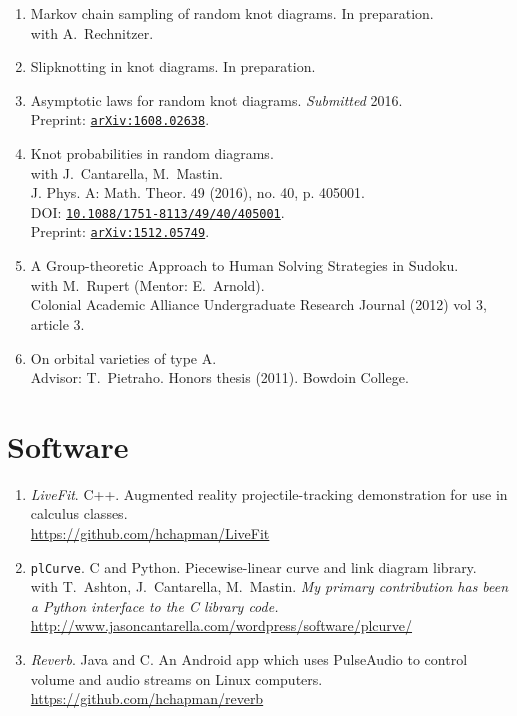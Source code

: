 \documentclass[letterpaper]{article}
\begin{document}
\begin{enumerate}
\item Markov chain sampling of random knot diagrams. In preparation. \\
  with A.\ Rechnitzer.
\item Slipknotting in knot diagrams. In preparation.
\item Asymptotic laws for random knot diagrams. \emph{Submitted} 2016. \\
  Preprint: \href{http://arxiv.org/abs/1608.02638}{\tt arXiv:1608.02638}.
\item Knot probabilities in random diagrams.\\
  with J.\ Cantarella, M.\ Mastin. \\
  J. Phys. A: Math. Theor. 49 (2016), no. 40, p. 405001.\\
  DOI: \href{http://dx.doi.org/10.1088/1751-8113/49/40/405001}{\tt 10.1088/1751-8113/49/40/405001}.\\
  Preprint: \href{http://arxiv.org/abs/1512.05749}{\tt arXiv:1512.05749}.
\item A Group-theoretic Approach to Human Solving Strategies in
  Sudoku.\\
  with M.\ Rupert (Mentor: E.\ Arnold). \\
  Colonial Academic Alliance Undergraduate Research Journal (2012) vol
  3, article 3.
\item On orbital varieties of type A. \\
  Advisor: T.\ Pietraho. Honors thesis (2011). Bowdoin
  College.
\end{enumerate}

\section*{Software}

\begin{enumerate}
\item \emph{LiveFit}. C++. Augmented reality projectile-tracking demonstration
  for use in calculus classes. \\
  \url{https://github.com/hchapman/LiveFit}
\item \texttt{plCurve}. C and Python. Piecewise-linear curve and link diagram library.\\
  with T.\ Ashton, J.\ Cantarella, M.\ Mastin.
  \textit{My primary contribution has been a Python interface to the C
    library code.} \\
  \url{http://www.jasoncantarella.com/wordpress/software/plcurve/}
\item \emph{Reverb}. Java and C. An Android app which uses PulseAudio to
  control volume and audio streams on Linux computers. \\
  \url{https://github.com/hchapman/reverb}
\end{enumerate}
\end{document}
